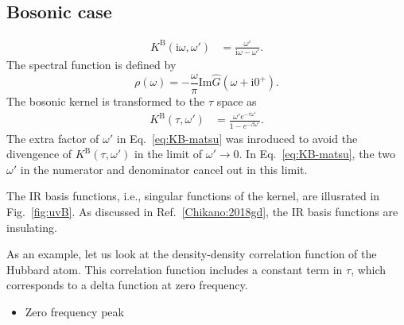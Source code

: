 \documentclass[submission, LectureNotes]{SciPost}
\newcommand{\wmax}{\ensuremath{{\omega_\mathrm{max}}}}
\newcommand\ee{\mathrm{e}}%
\newcommand\ii{\mathrm{i}}%
\newcommand\iw{\ii\omega}%
\begin{document}
\subsection{Bosonic case}
\begin{align}
    K^\mathrm{B}(\iw, \omega') &= \frac{\omega'}{\iw-\omega'}.\label{eq:KB-matsu}
\end{align}
The spectral function is defined by
\begin{equation}
    \rho(\omega) = -\frac{\omega}{\pi}
    \mathrm{Im} \hat G(\omega+\mathrm{i}0^+).
        \label{eq:rho}
\end{equation}
The bosonic kernel is transformed to the $\tau$ space as
\begin{align}
    K^\mathrm{B}(\tau,\omega') &= \frac{\omega' e^{-\tau\omega'}}{1-e^{-\beta\omega'}}.\label{eq:KB-tau}
\end{align}
The extra factor of $\omega'$ in Eq.~\eqref{eq:KB-matsu} was inroduced
to avoid the divengence of $K^\mathrm{B}(\tau,\omega')$ in the limit of $\omega'\rightarrow 0$.
In Eq.~\eqref{eq:KB-matsu}, the two $\omega'$ in the numerator and denominator cancel out in this limit.

The IR basis functions, i.e., singular functions of the kernel, are illusrated in Fig.~\ref{fig:uvB}.
As discussed in Ref.~\ref{Chikano:2018gd}, the IR basis functions are insulating.


As an example, let us look at the density-density correlation function of the Hubbard atom.
This correlation function includes a constant term in $\tau$, which corresponds to a delta function at zero frequency.

\begin{itemize}
    \item Zero frequency peak
\end{itemize}
\end{document}
